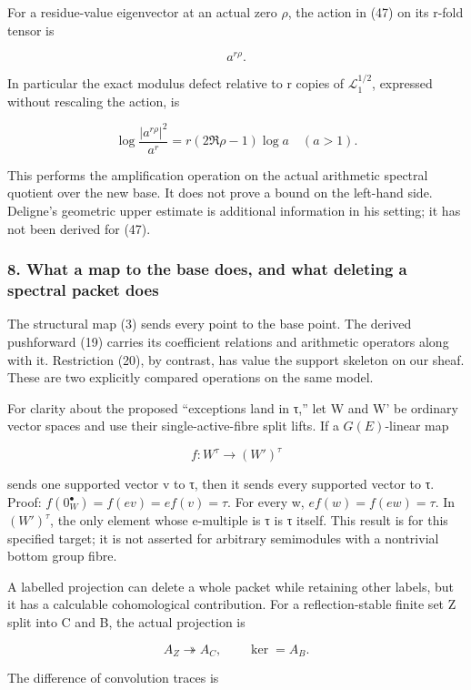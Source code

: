 For a residue-value eigenvector at an actual zero \(\rho\), the action in (47) on its r-fold tensor is

\[
a^{r\rho}.
\tag{49}
\]

In particular the exact modulus defect relative to r copies of \(\mathcal L_1^{1/2}\), expressed without rescaling the action, is

\[
\log\frac{|a^{r\rho}|^2}{a^r}
=r(2\Re\rho-1)\log a\quad(a>1).
\tag{50}
\]

This performs the amplification operation on the actual arithmetic spectral quotient over the new base. It does not prove a bound on the left-hand side. Deligne's geometric upper estimate is additional information in his setting; it has not been derived for (47).

\subsubsection{8. What a map to the base does, and what deleting a spectral packet does}\label{endpoint-tau_base--what-a-map-to-the-base-does-and-what-deleting-a-spectral-packet-does}

The structural map (3) sends every point to the base point. The derived pushforward (19) carries its coefficient relations and arithmetic operators along with it. Restriction (20), by contrast, has value the support skeleton on our sheaf. These are two explicitly compared operations on the same model.

For clarity about the proposed ``exceptions land in τ,'' let W and W' be ordinary vector spaces and use their single-active-fibre split lifts. If a \(G(E)\)-linear map

\[
f:W^\tau\to(W')^\tau
\]

sends one supported vector v to τ, then it sends every supported vector to τ. Proof: \(f(0_W^\bullet)=f(ev)=ef(v)=\tau\). For every w, \(ef(w)=f(ew)=\tau\). In \((W')^\tau\), the only element whose e-multiple is τ is τ itself. This result is for this specified target; it is not asserted for arbitrary semimodules with a nontrivial bottom group fibre.

A labelled projection can delete a whole packet while retaining other labels, but it has a calculable cohomological contribution. For a reflection-stable finite set Z split into C and B, the actual projection is

\[
A_Z\twoheadrightarrow A_C,\qquad\ker=A_B.
\tag{51}
\]

The difference of convolution traces is

